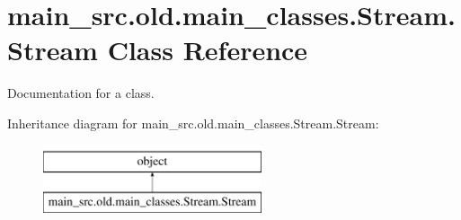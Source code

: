 \hypertarget{classmain__src_8old_1_1main__classes_1_1Stream_1_1Stream}{\section{main\-\_\-src.\-old.\-main\-\_\-classes.\-Stream.\-Stream Class Reference}
\label{classmain__src_8old_1_1main__classes_1_1Stream_1_1Stream}
}


Documentation for a class.  


Inheritance diagram for main\-\_\-src.\-old.\-main\-\_\-classes.\-Stream.\-Stream\-:\begin{figure}[H]
\begin{center}
\leavevmode
\includegraphics[height=2.000000cm]{classmain__src_8old_1_1main__classes_1_1Stream_1_1Stream}
\end{center}
\end{figure}
